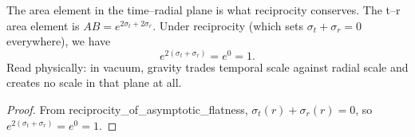 \begin{theorem}
The area element in the time--radial plane is what reciprocity conserves. The t--r area element is $AB = e^{2\sigma_t + 2\sigma_r}$. Under reciprocity (which sets $\sigma_t + \sigma_r = 0$ everywhere), we have
$$e^{2(\sigma_t + \sigma_r)} = e^0 = 1.$$
Read physically: in vacuum, gravity trades temporal scale against radial scale and creates no scale in that plane at all. 
\end{theorem}

\begin{proof}
From reciprocity\_of\_asymptotic\_flatness, $\sigma_t(r) + \sigma_r(r) = 0$, so $e^{2(\sigma_t + \sigma_r)} = e^0 = 1$.
\end{proof}


